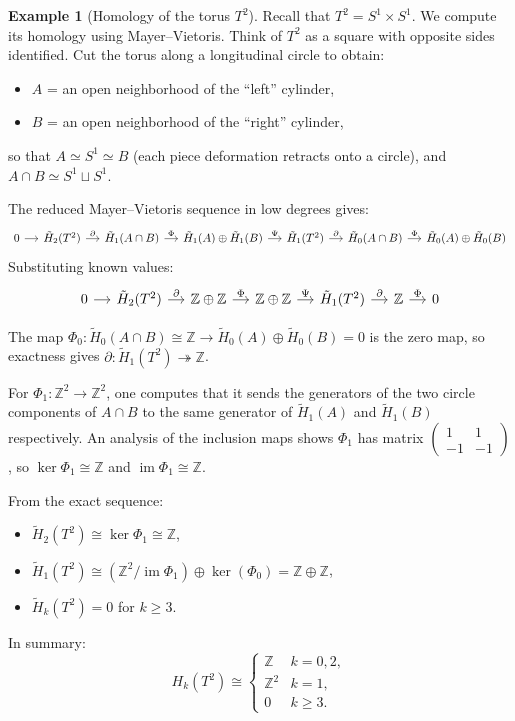 \documentclass[12pt,a4paper,openany]{book}
\theoremstyle{definition}
\newtheorem{example}[definition]{Example}
\theoremstyle{plain}
\theoremstyle{remark}
\newcommand{\Z}{\mathbb{Z}}
\DeclareMathOperator{\im}{im}
\begin{document}
\begin{example}[Homology of the torus $T^2$]
Recall that $T^2 = S^1\times S^1$. We compute its homology using
Mayer--Vietoris. Think of $T^2$ as a square with opposite sides
identified. Cut the torus along a longitudinal circle to obtain:
\begin{itemize}
  \item $A$ = an open neighborhood of the ``left'' cylinder,
  \item $B$ = an open neighborhood of the ``right'' cylinder,
\end{itemize}
so that $A\simeq S^1\simeq B$ (each piece deformation retracts onto
a circle), and $A\cap B\simeq S^1\sqcup S^1$.

The reduced Mayer--Vietoris sequence in low degrees gives:
\[
\begin{tikzcd}[column sep=small]
0 \ar[r]
  & \tilde{H}_2(T^2) \ar[r,"\partial"]
  & \tilde{H}_1(A\cap B) \ar[r,"\Phi"]
  & \tilde{H}_1(A)\oplus\tilde{H}_1(B) \ar[r,"\Psi"]
  & \tilde{H}_1(T^2) \ar[r,"\partial"]
  & \tilde{H}_0(A\cap B) \ar[r,"\Phi"]
  & \tilde{H}_0(A)\oplus\tilde{H}_0(B)
\end{tikzcd}
\]
Substituting known values:
\[
\begin{tikzcd}[column sep=small]
0 \ar[r]
  & \tilde{H}_2(T^2) \ar[r,"\partial"]
  & \Z\oplus\Z \ar[r,"\Phi"]
  & \Z\oplus\Z \ar[r,"\Psi"]
  & \tilde{H}_1(T^2) \ar[r,"\partial"]
  & \Z \ar[r,"\Phi"]
  & 0
\end{tikzcd}
\]

The map $\Phi_0\colon\tilde{H}_0(A\cap B)\cong\Z\to\tilde{H}_0(A)\oplus
\tilde{H}_0(B)=0$ is the zero map, so exactness gives
$\partial\colon\tilde{H}_1(T^2)\twoheadrightarrow\Z$.

For $\Phi_1\colon\Z^2\to\Z^2$, one computes that it sends the
generators of the two circle components of $A\cap B$ to the
same generator of $\tilde{H}_1(A)$ and $\tilde{H}_1(B)$ respectively.
An analysis of the inclusion maps shows $\Phi_1$ has matrix
$\begin{pmatrix}1&1\\-1&-1\end{pmatrix}$, so $\ker\Phi_1\cong\Z$
and $\im\Phi_1\cong\Z$.

From the exact sequence:
\begin{itemize}
  \item $\tilde{H}_2(T^2)\cong\ker\Phi_1\cong\Z$,
  \item $\tilde{H}_1(T^2)\cong(\Z^2/\im\Phi_1)\oplus\ker(\Phi_0)
         = \Z\oplus\Z$,
  \item $\tilde{H}_k(T^2)=0$ for $k\geq 3$.
\end{itemize}

In summary:
\[
  H_k(T^2) \cong
  \begin{cases}
    \Z   & k=0,2,\\
    \Z^2 & k=1,\\
    0    & k\geq 3.
  \end{cases}
\]
\end{example}
\end{document}
